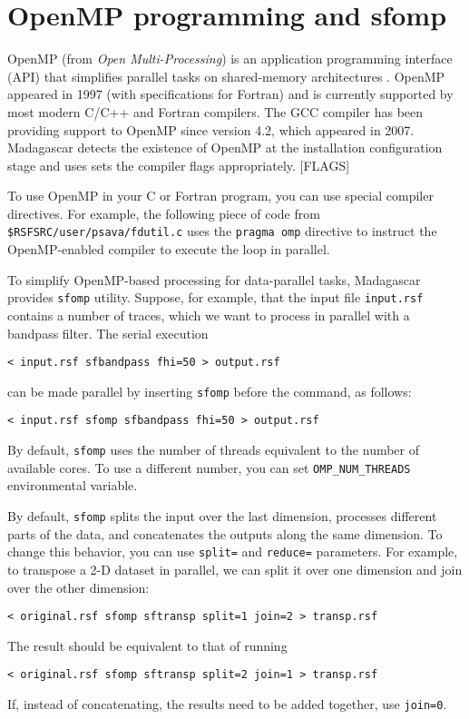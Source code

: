 \section{OpenMP programming and sfomp}

OpenMP (from \emph{Open Multi-Processing}) is an application
programming interface (API) that simplifies parallel tasks on
shared-memory architectures \cite[]{chandra,chapman}. OpenMP appeared
in 1997 (with specifications for Fortran) and is currently supported
by most modern C/C++ and Fortran compilers. The GCC compiler has been
providing support to OpenMP since version 4.2, which appeared in
2007. Madagascar detects the existence of OpenMP at the installation
configuration stage and uses sets the compiler flags appropriately. [FLAGS]

To use OpenMP in your C or Fortran program, you can use special
compiler directives. For example, the following piece of code from
\texttt{\$RSFSRC/user/psava/fdutil.c} uses the \texttt{pragma omp}
directive to instruct the OpenMP-enabled compiler to execute the loop
in parallel.

\lstset{language=c,numbers=left,numberstyle=\tiny,showstringspaces=false}


To simplify OpenMP-based processing for data-parallel tasks,
Madagascar provides \texttt{sfomp} utility. Suppose, for example, that
the input file \texttt{input.rsf} contains a number of traces, which
we want to process in parallel with a bandpass filter. The serial execution
\begin{verbatim}
< input.rsf sfbandpass fhi=50 > output.rsf
\end{verbatim}
can be made parallel by inserting \texttt{sfomp} before the command, as follows:
\begin{verbatim}
< input.rsf sfomp sfbandpass fhi=50 > output.rsf
\end{verbatim}

By default, \texttt{sfomp} uses the number of threads equivalent to
the number of available cores. To use a different number, you can set
\texttt{OMP\_NUM\_THREADS} environmental variable.

By default, \texttt{sfomp} splits the input over the last dimension,
processes different parts of the data, and concatenates the outputs
along the same dimension. To change this behavior, you can use
\texttt{split=} and \texttt{reduce=} parameters. For example, to
transpose a 2-D dataset in parallel, we can split it over one
dimension and join over the other dimension:
\begin{verbatim}
< original.rsf sfomp sftransp split=1 join=2 > transp.rsf
\end{verbatim}
The result should be equivalent to that of running
\begin{verbatim}
< original.rsf sfomp sftransp split=2 join=1 > transp.rsf
\end{verbatim}
If, instead of concatenating, the results need to be added together,
use \texttt{join=0}.

